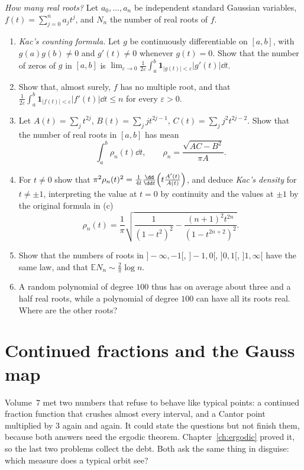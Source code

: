\begin{exercise}[Journey]\label{pb:kaczeros}
\emph{How many real roots?} Let $a_0,\dots,a_n$ be independent standard Gaussian variables, $f(t)=\sum_{j=0}^na_jt^j$, and $N_n$ the number of real roots of $f$.
\begin{enumerate}[label=(\alph*)]
\item \emph{Kac's counting formula.} Let $g$ be continuously differentiable on $[a,b]$, with $g(a)g(b)\ne0$ and $g'(t)\ne0$ whenever $g(t)=0$. Show that the number
of zeros of $g$ in $[a,b]$ is $\lim_{\varepsilon\to0}\frac1{2\varepsilon}\int_a^b\mathbf 1_{|g(t)|<\varepsilon}|g'(t)|\dd t$.
\item Show that, almost surely, $f$ has no multiple root, and that $\frac1{2\varepsilon}\int_a^b\mathbf 1_{|f(t)|<\varepsilon}|f'(t)|\dd t\le n$ for every $\varepsilon>0$.
\item Let $A(t)=\sum_jt^{2j}$, $B(t)=\sum_jjt^{2j-1}$, $C(t)=\sum_jj^2t^{2j-2}$. Show that the number of real roots in $[a,b]$ has mean
\[
\int_a^b\rho_n(t)\dd t,\qquad \rho_n=\frac{\sqrt{AC-B^2}}{\pi A}.
\]
\item For $t\ne0$ show that $\pi^2\rho_n(t)^2=\frac1{4t}\frac{\dd}{\dd t}\Bigl(t\frac{A'(t)}{A(t)}\Bigr)$, and deduce \emph{Kac's density} for $t\ne\pm1$, interpreting the value at $t=0$ by continuity and the values at $\pm1$ by the original formula in (c)
\[
\rho_n(t)=\frac1\pi\sqrt{\frac1{(1-t^2)^2}-\frac{(n+1)^2t^{2n}}{(1-t^{2n+2})^2}}.
\]
\item Show that the numbers of roots in $]-\infty,-1[$, $]-1,0[$, $]0,1[$, $]1,\infty[$ have the same law, and that $\mathbb EN_n\sim\frac2\pi\log n$.
\item A random polynomial of degree $100$ thus has on average about three and a half real roots, while a polynomial of degree $100$ can have all its roots real. Where are the
other roots?
\end{enumerate}
\end{exercise}

\section{Continued fractions and the Gauss map}

Volume~7 met two numbers that refuse to behave like typical points: a continued fraction function that crushes almost every interval, and a Cantor point
multiplied by $3$ again and again. It could state the questions but not finish them, because both answers need the ergodic theorem. Chapter~\ref{ch:ergodic}
proved it, so the last two problems collect the debt. Both ask the same thing in disguise: which measure does a typical orbit see?

